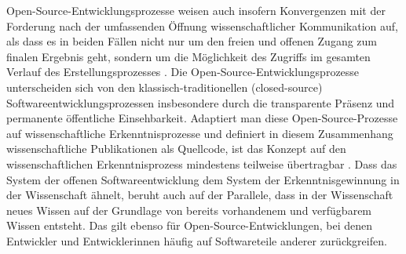 Open-Source-Entwicklungsprozesse weisen auch insofern Konvergenzen mit der Forderung nach der umfassenden Öffnung wissenschaftlicher Kommunikation auf, als dass es in beiden Fällen nicht nur um den freien und offenen Zugang zum finalen Ergebnis geht, sondern um die Möglichkeit des Zugriffs im gesamten Verlauf des Erstellungsprozesses \cite{Kelty_2004}. Die Open-Source-Entwicklungsprozesse unterscheiden sich von den klassisch-traditionellen (closed-source) Softwareentwicklungsprozessen insbesondere durch die transparente Präsenz und permanente öffentliche Einsehbarkeit. Adaptiert man diese Open-Source-Prozesse auf wissenschaftliche Erkenntnisprozesse und definiert in diesem Zusammenhang wissenschaftliche Publikationen als Quellcode, ist das Konzept auf den wissenschaftlichen Erkenntnisprozess mindestens teilweise übertragbar \cite{Garcia_2010} \cite{Singh_2008} \cite{Bradley_2008} \cite{Mantz_2007} \cite{Dorschel_2006} \cite{Bradley_2007} \cite{Willinsky_2005}. Dass das System der offenen Softwareentwicklung dem System der Erkenntnisgewinnung in der Wissenschaft ähnelt, beruht auch auf der Parallele, dass in der Wissenschaft neues Wissen auf der Grundlage von bereits vorhandenem und verfügbarem Wissen entsteht. Das gilt ebenso für Open-Source-Entwicklungen, bei denen Entwickler und Entwicklerinnen häufig auf Softwareteile anderer zurückgreifen.

